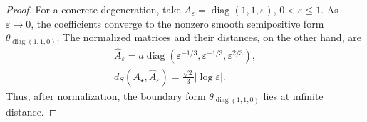 \begin{proof}
For a concrete degeneration, take $A_\varepsilon=\operatorname{diag}(1,1,\varepsilon)$, $0<\varepsilon\leq1$. As $\varepsilon\to0$, the coefficients converge to the nonzero smooth semipositive form $\theta_{\operatorname{diag}(1,1,0)}$. The normalized matrices and their distances, on the other hand, are
\begin{equation}\label{eq:iwasawa-diagonal-degeneration}
 \begin{gathered}
 \widehat A_\varepsilon
   =a\operatorname{diag}(\varepsilon^{-1/3},\varepsilon^{-1/3},\varepsilon^{2/3}),\\
 d_S(A_\star,\widehat A_\varepsilon)=\frac{\sqrt2}{3}|\log\varepsilon|.
 \end{gathered}
\end{equation}
Thus, after normalization, the boundary form $\theta_{\operatorname{diag}(1,1,0)}$ lies at infinite distance.
\end{proof}
